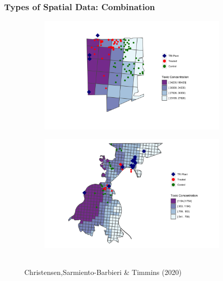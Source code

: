 \documentclass[
  shownotes,
  xcolor={svgnames},
  hyperref={colorlinks,citecolor=DarkBlue,linkcolor=DarkRed,urlcolor=DarkBlue}
  ]{beamer}
\begin{document}
\begin{frame}[fragile]
\frametitle{Types of Spatial Data: Combination}

\begin{figure}[H] \centering
  \centering
  
\begin{subfigure}{0.45\linewidth}
\includegraphics[scale=0.08]{figures/ZIP_A.png}
\end{subfigure}
\begin{subfigure}{0.45\linewidth}
\includegraphics[scale=0.08]{figures/ZIP_B.png}

\end{subfigure}
  \\
  \tiny Christensen,Sarmiento-Barbieri  \& Timmins (2020)
\end{figure}


\end{frame}
\end{document}

